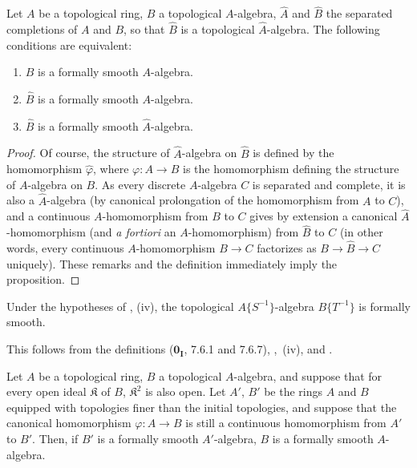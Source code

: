\begin{proposition}[19.3.6]
\label{0.19.3.6}
Let $A$ be a topological ring, $B$ a topological $A$-algebra, $\widehat{A}$ and $\widehat{B}$ the separated completions of $A$ and $B$, so that $\widehat{B}$ is a topological $\widehat{A}$-algebra.
The following conditions are equivalent:
\begin{enumerate}
  \item[\textup{a)}] $B$ is a formally smooth $A$-algebra.
  \item[\textup{b)}] $\widehat{B}$ is a formally smooth $A$-algebra.
  \item[\textup{c)}] $\widehat{B}$ is a formally smooth $\widehat{A}$-algebra.
\end{enumerate}
\end{proposition}

\begin{proof}
Of course, the structure of $\widehat{A}$-algebra on $\widehat{B}$ is defined by the homomorphism $\hat{\varphi}$, where $\varphi:A\to B$ is the homomorphism defining the structure of $A$-algebra on $B$.
As every discrete $A$-algebra $C$ is separated and complete, it is also a $\widehat{A}$-algebra (by canonical prolongation of the homomorphism from $A$ to $C$), and a continuous $A$-homomorphism from $B$ to $C$ gives by extension a canonical $\widehat{A}$-homomorphism (and \emph{a fortiori} an $A$-homomorphism) from $\widehat{B}$ to $C$ (in other words, every continuous $A$-homomorphism $B\to C$ factorizes as $B\to\widehat{B}\to C$ uniquely).
These remarks and the definition  immediately imply the proposition.
\end{proof}

\begin{corollary}[19.3.7]
\label{0.19.3.7}
Under the hypotheses of , \textup{(iv)}, the topological $A\{S^{-1}\}$-algebra $B\{T^{-1}\}$ is formally smooth.
\end{corollary}

This follows from the definitions ($\mathbf{0_I}$, 7.6.1 and 7.6.7),
,~(iv), and .

\begin{proposition}[19.3.8]
\label{0.19.3.8}
Let $A$ be a topological ring, $B$ a topological $A$-algebra, and suppose that for every open ideal $\mathfrak K$ of $B$, $\mathfrak K^2$ is also open.
Let $A'$, $B'$ be the rings $A$ and $B$ equipped with topologies finer than the initial topologies, and suppose that the canonical homomorphism $\varphi:A\to B$ is still a continuous homomorphism from $A'$ to $B'$.
Then, if $B'$ is a formally smooth $A'$-algebra, $B$ is a formally smooth $A$-algebra.
\end{proposition}

